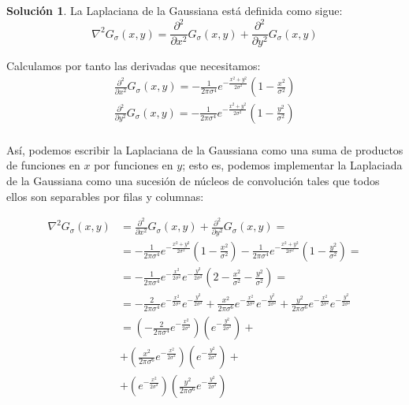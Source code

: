 \documentclass[a4paper, 11pt]{article}
\theoremstyle{definition}
\newtheorem*{solucion}{Solución}
\theoremstyle{theorem}
\begin{document}
  \begin{solucion}
      La Laplaciana de la Gaussiana está definida como sigue:
      \[
      \nabla^2 G_\sigma(x,y) =  \frac{\partial^2}{\partial x^2} G_\sigma(x,y) + \frac{\partial^2}{\partial y^2} G_\sigma(x,y)
      \]

      Calculamos por tanto las derivadas que necesitamos:
      \begin{align*}
          \frac{\partial^2}{\partial x^2} G_\sigma(x,y) =  -\frac{1}{2\pi\sigma^4}e^{-\frac{x^2+y^2}{2\sigma^2}}\left(1 - \frac{x^2}{\sigma^2}\right) \\
          \frac{\partial^2}{\partial y^2} G_\sigma(x,y) =  -\frac{1}{2\pi\sigma^4}e^{-\frac{x^2+y^2}{2\sigma^2}}\left(1 - \frac{y^2}{\sigma^2}\right) \\
      \end{align*}

      Así, podemos escribir la Laplaciana de la Gaussiana como una suma de productos de funciones en $x$ por funciones en $y$; esto es, podemos implementar la Laplaciada de la Gaussiana como una sucesión de núcleos de convolución tales que todos ellos son separables por filas y columnas:

      \begin{align*}
          \nabla^2 G_\sigma(x,y) &=  \frac{\partial^2}{\partial x^2} G_\sigma(x,y) + \frac{\partial^2}{\partial y^2} G_\sigma(x,y) = \\
          &= -\frac{1}{2\pi\sigma^4}e^{-\frac{x^2+y^2}{2\sigma^2}}\left(1 - \frac{x^2}{\sigma^2}\right) - \frac{1}{2\pi\sigma^4}e^{-\frac{x^2+y^2}{2\sigma^2}}\left(1 - \frac{y^2}{\sigma^2}\right) = \\
          &= -\frac{1}{2\pi\sigma^4}e^{-\frac{x^2}{2\sigma^2}}e^{-\frac{y^2}{2\sigma^2}}\left(2 - \frac{x^2}{\sigma^2} - \frac{y^2}{\sigma^2}\right) = \\
          &= -\frac{2}{2\pi\sigma^4}e^{-\frac{x^2}{2\sigma^2}}e^{-\frac{y^2}{2\sigma^2}} + \frac{x^2}{2\pi\sigma^6}e^{-\frac{x^2}{2\sigma^2}}e^{-\frac{y^2}{2\sigma^2}} + \frac{y^2}{2\pi\sigma^6}e^{-\frac{x^2}{2\sigma^2}}e^{-\frac{y^2}{2\sigma^2}} \\
          &= \left(-\frac{2}{2\pi\sigma^4}e^{-\frac{x^2}{2\sigma^2}}\right)\left(e^{-\frac{y^2}{2\sigma^2}}\right) +\\
          &+ \left(\frac{x^2}{2\pi\sigma^6}e^{-\frac{x^2}{2\sigma^2}}\right)\left(e^{-\frac{y^2}{2\sigma^2}}\right) +\\
          &+ \left(e^{-\frac{x^2}{2\sigma^2}}\right)\left(\frac{y^2}{2\pi\sigma^6}e^{-\frac{y^2}{2\sigma^2}}\right)
      \end{align*}
  \end{solucion}
\end{document}

